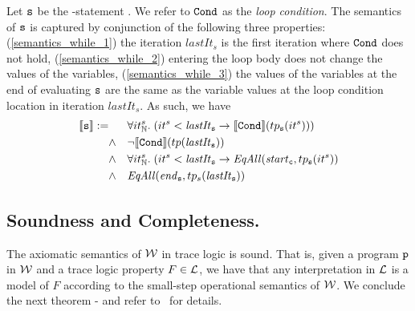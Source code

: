 Let $\texttt{s}$ be the \whileStatement-statement .
%
We refer to $\texttt{Cond}$ as the \emph{loop condition}.
%
The semantics of $\texttt{s}$ is captured by conjunction of the  following three  properties: 
(\ref{semantics_while_1}) the iteration $\mathit{lastIt}_s$ is the first iteration where $\texttt{Cond}$ does not hold,
(\ref{semantics_while_2}) entering the loop body does not change the values of the variables, 
(\ref{semantics_while_3}) the values of the variables at the end of evaluating $\texttt{s}$ 
are the same as the variable values 
at the loop condition location in iteration $\mathit{lastIt}_s$. As
such, we have 
\begin{subequations}
	\begin{align}
	\llbracket \texttt{s} \rrbracket :=      &&&\forall it^s_{\mathbb{N}}. \; (it^s<\mathit{lastIt}_{\texttt{s}} \rightarrow \llbracket \texttt{Cond} \rrbracket (tp_{\texttt{s}}(it^s))) \nonumber\\
	&\land &&\neg \llbracket \texttt{Cond} \rrbracket (tp(\mathit{lastIt}_{\texttt{s}})) \label{semantics_while_1}\\
	&\land &&\forall it^s_{\mathbb{N}}. \; (it^s<\mathit{lastIt}_{\texttt{s}} \rightarrow \mathit{EqAll}(\mathit{start}_{\texttt{c}},tp_{\texttt{s}}(it^s)) \label{semantics_while_2}\\
	&\land && \mathit{EqAll}(\mathit{end}_{\texttt{s}}, tp_s(\mathit{lastIt}_{\texttt{s}})) \label{semantics_while_3}
	\end{align}
\end{subequations}

\subsection{Soundness and Completeness.}

The axiomatic semantics of $\mathcal{W}$ in trace logic is sound. That
is, given a program $\texttt{p}$ in $\mathcal{W}$ and a trace logic
property $F \in \mathcal{L}$,
we have that any interpretation in $\mathcal{L}$ is a model of
$F$ according to the small-step operational semantics of
$\mathcal{W}$. We conclude the next theorem - and refer
to~\cite{extendedversion} for details. 

%

